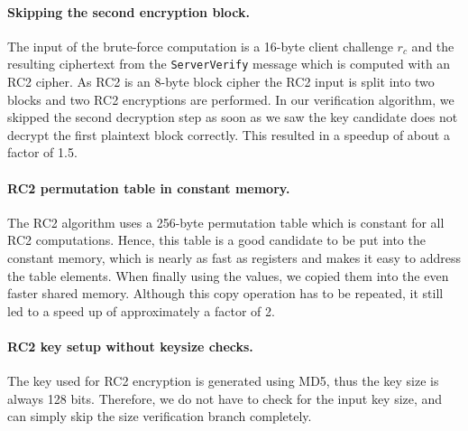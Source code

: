 \paragraph{Skipping the second encryption block.} The input of the brute-force computation is a 16-byte client challenge $r_c$ and the resulting ciphertext from the \texttt{ServerVerify} message which is computed with an RC2 cipher. As RC2 is an 8-byte block cipher the RC2 input is split into two blocks and two RC2 encryptions are performed. In our verification algorithm, we skipped the second decryption step as soon as we saw the key candidate does not decrypt the first plaintext block correctly. This resulted in a speedup of about a factor of 1.5.

\paragraph{RC2 permutation table in constant memory.}
The RC2 algorithm uses a 256-byte permutation table which is constant for all RC2 computations. Hence, this table is a good candidate to be put into the constant memory, which is nearly as fast as registers and makes it easy to address the table elements. When finally using the values, we copied them into the even faster shared memory. Although this copy operation has to be repeated, it still led to a speed up of approximately a factor of 2.

\paragraph{RC2 key setup without keysize checks.}
The key used for RC2 encryption is generated using MD5, thus the key size is always 128 bits. Therefore, we do not have to check for the input key size, and can simply skip the size verification branch completely.

